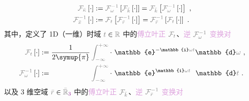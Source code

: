 \begin{subequations} \label{eq:FT-xkappa}
	\abovedisplayskip=10pt
	\belowdisplayskip=12pt
\begin{align}
	\mathcolor{gray}{\mathcal F_{\bar{\kappa}}} \left[ \cdot \right] &:= \mathcolor{gray}{\mathcal F_{\omega}^{-1}} \left[ \mathcolor{gray}{\mathcal F_{\bar{k}}} \left[ \cdot \right] \right] = \mathcolor{gray}{\mathcal F_{\bar{k}}} \left[ \mathcolor{gray}{\mathcal F_{\omega}^{-1}} \left[ \cdot \right] \right] ~, \label{eq:FT-kappa} \\
	\mathcolor{gray}{\mathcal F_{\bar{x}}^{-1}} \left[ \cdot \right] &:= \mathcolor{gray}{\mathcal F_{t}} \left[ \mathcolor{gray}{\mathcal F_{\bar{r}}^{-1}} \left[ \cdot \right] \right] = \mathcolor{gray}{\mathcal F_{\bar{r}}^{-1}} \left[ \mathcolor{gray}{\mathcal F_{t}} \left[ \cdot \right] \right] ~. \label{eq:IFT-x}
\end{align}
\end{subequations}
其中，定义了 1D（一维）时域 $\mathcolor{gray}{t} \in \mathcolor{gray}{\mathbb{R}}$ 中的\textcolor{Plum}{傅立叶正} $\mathcolor{gray}{\mathcal F_{t}}$、\textcolor{Plum}{逆} $\mathcolor{gray}{\mathcal F_{\omega}^{-1}}$ \textcolor{Plum}{变换对}
\begin{subequations} \label{eq:FT-tw}
	\abovedisplayskip=10pt
	\belowdisplayskip=12pt
\begin{align}
	\mathcolor{gray}{\mathcal F_{t}} \left[ \cdot \right] &:= \frac{ 1 }{ 2\symup{\pi} } \mathcolor{gray}{\int_{-\infty}^{+\infty}} \cdot~ \mathbb{e}^{-\mathbb{i}\mathcolor{gray}{\omega} \mathcolor{gray}{t}} \mathbb{d}\mathcolor{gray}{\omega} ~, \label{eq:FT-t} \\
	\mathcolor{gray}{\mathcal F_{\omega}^{-1}} \left[ \cdot \right] &:= \hphantom{\frac{ 1 }{ 2\symup{\pi} }} \mathcolor{gray}{\int_{-\infty}^{+\infty}} \cdot~ \mathbb{e}^{\mathbb{i}\mathcolor{gray}{\omega} \mathcolor{gray}{t}} \hphantom{^-} \mathbb{d}\mathcolor{gray}{t} ~. \label{eq:IFT-w}
\end{align}
\end{subequations}
以及 3 维空域 $\mathcolor{gray}{\bar{r}} \in \mathcolor{gray}{\bar{\mathbb{R}}_{\textcolor{Plum}{3}}}$ 中的\textcolor{Plum}{傅立叶正} $\mathcolor{gray}{\mathcal F_{\bar{k}}}$、\textcolor{Plum}{逆} $\mathcolor{gray}{\mathcal F_{\bar{r}}^{-1}}$ \textcolor{Plum}{变换对}
